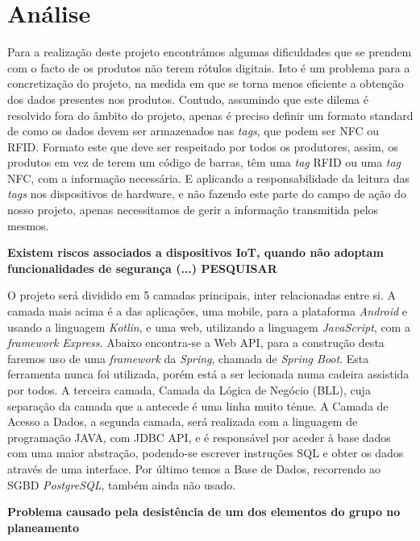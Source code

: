 %
%
\chapter*{Análise} \label{Analise}

Para a realização deste projeto encontrámos algumas dificuldades que se prendem com o facto de os produtos não terem rótulos digitais. Isto é um problema para a concretização do projeto, na medida em que se torna menos eficiente a obtenção dos dados presentes nos produtos. Contudo, assumindo que este dilema é resolvido fora do âmbito do projeto, apenas é preciso definir um formato standard de como os dados devem ser armazenados nas \textit{tags}, que podem ser NFC ou RFID. Formato este que deve ser respeitado por todos os produtores, assim, os produtos em vez de terem um código de barras, têm uma \textit{tag} RFID ou uma \textit{tag} NFC, com a informação necessária. E aplicando a responsabilidade da leitura das \textit{tags} nos dispositivos de hardware, e não fazendo este parte do campo de ação do nosso projeto, apenas necessitamos de gerir a informação transmitida pelos mesmos.

\vspace{1cm}
\textbf{Existem riscos associados a dispositivos IoT, quando não adoptam funcionalidades de segurança (...) PESQUISAR}
\vspace{1cm}

O projeto será dividido em 5 camadas principais, inter relacionadas entre si. A camada mais acima é a das aplicações, uma mobile, para a plataforma \textit{Android} e usando a linguagem \textit{Kotlin}, e uma web, utilizando a linguagem \textit{JavaScript}, com a \textit{framework Express}. Abaixo encontra-se a Web API, para a construção desta faremos uso de uma \textit{framework} da \textit{Spring}, chamada de \textit{Spring Boot}. Esta ferramenta nunca foi utilizada, porém está a ser lecionada numa cadeira assistida por todos. A terceira camada, Camada da Lógica de Negócio (BLL), cuja separação da camada que a antecede é uma linha muito ténue. A Camada de Acesso a Dados, a segunda camada, será realizada com a linguagem de programação JAVA, com JDBC API, e é responsável por aceder à base dados com uma maior abstração, podendo-se escrever instruções SQL e obter os dados através de uma interface. Por último temos a Base de Dados, recorrendo ao SGBD \textit{PostgreSQL}, também ainda não usado.

\vspace{1cm}
\textbf{Problema causado pela desistência de um dos elementos do grupo no planeamento}
\vfill